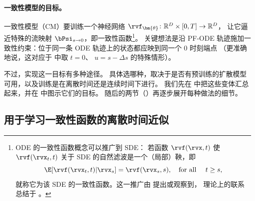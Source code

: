 \paragraph{一致性模型的目标。}
一致性模型（CM）要训练一个神经网络
$\rvf_{\bm{\theta}} \colon \mathbb{R}^D \times [0,T] \to \mathbb{R}^D$，
让它逼近特殊的流映射 $\bPsi_{s\to 0}$，即一致性函数\footnote{ODE 的一致性函数概念可以推广到 SDE：
若函数 $\rvf(\rvx,t)$ 使 $\rvf(\rvx_t,t)$ 关于 SDE 的自然滤波是一个（局部）鞅，即
\[
\E[\rvf(\rvx_t,t)|\rvx_s]=\rvf(\rvx_s,s),\quad\text{for all }\quad t\ge s,
\]
就称它为该 SDE 的一致性函数。这一推广由 \citep{daras2023consistent,lai2023fp} 提出或观察到，
理论上的联系总结于 \citep{lai2023equivalence}。}。
关键想法是沿 PF-ODE 轨迹施加一致性约束：位于同一条 ODE 轨迹上的状态都应映到同一个 $0$ 时刻端点
（更准确地说，这对应于  中取 $t=0$、
$u=s-\Delta s$ 的特殊情形）。

不过，实现这一目标有多种途径。
具体选哪种，取决于是否有预训练的扩散模型可用，以及训练是在离散时间还是连续时间下进行。
我们先在  中把这些变体汇总起来，并在  中图示它们的目标。
随后的两节（）再逐步展开每种做法的细节。

\begin{table}[th]
  \caption{一致性模型的各类训练目标}
  \small
  \centering
  \label{tb:consistency-methods}
\end{table}


\subsection{用于学习一致性函数的离散时间近似}\label{subsec:approx-cm}


